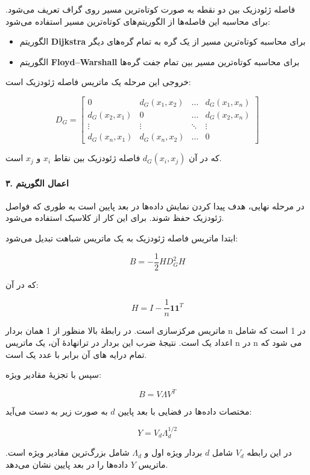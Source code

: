 \documentclass{article}
\begin{document}
فاصله ژئودزیک بین دو نقطه به صورت کوتاه‌ترین مسیر روی گراف تعریف می‌شود. برای محاسبه این فاصله‌ها از الگوریتم‌های کوتاه‌ترین مسیر استفاده می‌شود:

\begin{itemize}
	\item الگوریتم \textbf{Dijkstra} برای محاسبه کوتاه‌ترین مسیر از یک گره به تمام گره‌های دیگر
	\item الگوریتم \textbf{Floyd–Warshall} برای محاسبه کوتاه‌ترین مسیر بین تمام جفت گره‌ها
\end{itemize}

خروجی این مرحله یک ماتریس فاصله ژئودزیک است:

\[
D_G =
\begin{bmatrix}
	0 & d_G(x_1,x_2) & \dots & d_G(x_1,x_n) \\
	d_G(x_2,x_1) & 0 & \dots & d_G(x_2,x_n) \\
	\vdots & \vdots & \ddots & \vdots \\
	d_G(x_n,x_1) & d_G(x_n,x_2) & \dots & 0
\end{bmatrix}
\]

که در آن \(d_G(x_i,x_j)\) فاصله ژئودزیک بین نقاط \(x_i\) و \(x_j\) است.

\paragraph{۳. اعمال الگوریتم }
در مرحله نهایی، هدف پیدا کردن نمایش داده‌ها در بعد پایین است به طوری که فواصل ژئودزیک حفظ شوند. برای این کار از  کلاسیک استفاده می‌شود.

ابتدا ماتریس فاصله ژئودزیک به یک ماتریس شباهت تبدیل می‌شود:

\[
B = -\frac{1}{2} H D_G^2 H
\]

که در آن:

\[
H = I - \frac{1}{n}\mathbf{1}\mathbf{1}^T
\]

ماتریس مرکزسازی  است. در رابطۀ بالا منظور از 1 همان بردار n در 1 است که شامل اعداد یک است. نتیجۀ ضرب این بردار در ترانهادۀ آن، یک ماتریس n در n می شود که تمام درایه های آن برابر با عدد یک است.

سپس با تجزیۀ مقادیر ویژه:

\[
B = V \Lambda V^T
\]

مختصات داده‌ها در فضایی با بعد پایین \(d\) به صورت زیر به دست می‌آید:

\[
Y = V_d \Lambda_d^{1/2}
\]

در این رابطه \(V_d\) شامل \(d\) بردار ویژه اول و \(\Lambda_d\) شامل بزرگ‌ترین مقادیر ویژه است. ماتریس \(Y\) داده‌ها را در بعد پایین نشان می‌دهد.
\end{document}
